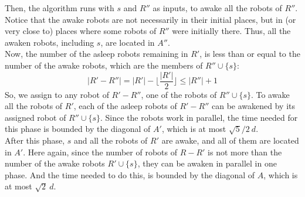\documentclass[review]{elsarticle}
\begin{document}
Then, the algorithm runs with $s$ and $R''$ as inputs, to awake all the robots of $R''$. Notice that the awake robots are not necessarily in their initial places, but in (or very close to) places where some robots of $R''$ were initially there. Thus, all the awaken robots, including $s$, are located in $A''$.\\
Now, the number of the asleep robots remaining in $R'$, is less than or equal to the number of the awake robots, which are the members of $R''\cup\{s\}$:
$$ |R'-R''|=|R'|-\big\lfloor\dfrac{|R'|}{2}\big\rfloor \leq |R''|+1 $$
So, we assign to any robot of $R'-R''$, one of the robots of $R''\cup\{s\}$. To awake all the robots of $R'$, each of the asleep robots of $R'-R''$ can be awakened by its assigned robot of $R''\cup\{s\}$. Since the robots work in parallel, the time needed for this phase is bounded by the diagonal of $A'$, which is at most $\sqrt{5}/2~d$.\\
After this phase, $s$ and all the robots of $R'$ are awake, and all of them are located in $A'$. Here again, since the number of robots of $R-R'$ is not more than the number of the awake robots $R'\cup\{s\}$, they can be awaken in parallel in one phase. And the time needed to do this, is bounded by the diagonal of $A$, which is at most $\sqrt{2}~d$.
\end{document}
